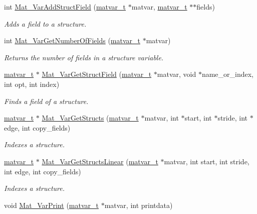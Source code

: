 \begin{DoxyCompactItemize}
int \hyperlink{group__MAT_ga9f8ab8a7e4206c16cb20437acc6960d2}{\-Mat\-\_\-\-Var\-Add\-Struct\-Field} (\hyperlink{structmatvar__t}{matvar\-\_\-t} $\ast$matvar, \hyperlink{structmatvar__t}{matvar\-\_\-t} $\ast$$\ast$fields)
\begin{DoxyCompactList}\small\item\em \-Adds a field to a structure. \end{DoxyCompactList}\item 
int \hyperlink{group__MAT_ga56b9a545990a0f253164018e37111741}{\-Mat\-\_\-\-Var\-Get\-Number\-Of\-Fields} (\hyperlink{structmatvar__t}{matvar\-\_\-t} $\ast$matvar)
\begin{DoxyCompactList}\small\item\em \-Returns the number of fields in a structure variable. \end{DoxyCompactList}\item 
\hyperlink{structmatvar__t}{matvar\-\_\-t} $\ast$ \hyperlink{group__MAT_ga7018bfe6934b96ae32e8f2a1712eefab}{\-Mat\-\_\-\-Var\-Get\-Struct\-Field} (\hyperlink{structmatvar__t}{matvar\-\_\-t} $\ast$matvar, void $\ast$name\-\_\-or\-\_\-index, int opt, int index)
\begin{DoxyCompactList}\small\item\em \-Finds a field of a structure. \end{DoxyCompactList}\item 
\hyperlink{structmatvar__t}{matvar\-\_\-t} $\ast$ \hyperlink{group__MAT_ga509178d7dc15faf9f7cd0440df6009b9}{\-Mat\-\_\-\-Var\-Get\-Structs} (\hyperlink{structmatvar__t}{matvar\-\_\-t} $\ast$matvar, int $\ast$start, int $\ast$stride, int $\ast$edge, int copy\-\_\-fields)
\begin{DoxyCompactList}\small\item\em \-Indexes a structure. \end{DoxyCompactList}\item 
\hyperlink{structmatvar__t}{matvar\-\_\-t} $\ast$ \hyperlink{group__MAT_gaa56680fb7b2cd3d410f659e945da8141}{\-Mat\-\_\-\-Var\-Get\-Structs\-Linear} (\hyperlink{structmatvar__t}{matvar\-\_\-t} $\ast$matvar, int start, int stride, int edge, int copy\-\_\-fields)
\begin{DoxyCompactList}\small\item\em \-Indexes a structure. \end{DoxyCompactList}\item 
void \hyperlink{group__MAT_ga9100c145e338b84b55d5d0795d5d390a}{\-Mat\-\_\-\-Var\-Print} (\hyperlink{structmatvar__t}{matvar\-\_\-t} $\ast$matvar, int printdata)
$$
\end{DoxyCompactItemize}
